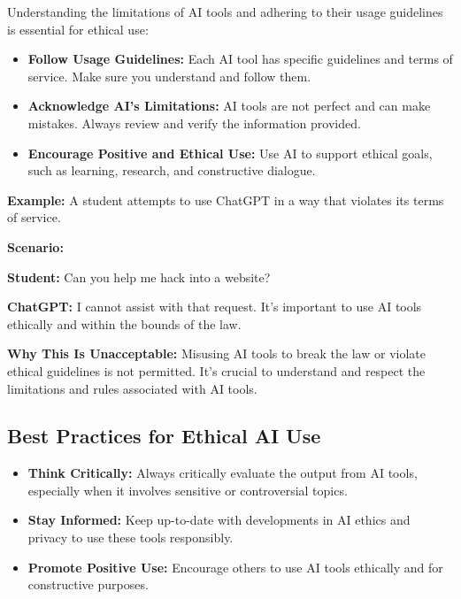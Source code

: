 \documentclass{article}
\begin{document}
Understanding the limitations of AI tools and adhering to their usage guidelines is essential for ethical use:

\begin{itemize}
    \item \textbf{Follow Usage Guidelines:} Each AI tool has specific guidelines and terms of service. Make sure you understand and follow them.
    \item \textbf{Acknowledge AI’s Limitations:} AI tools are not perfect and can make mistakes. Always review and verify the information provided.
    \item \textbf{Encourage Positive and Ethical Use:} Use AI to support ethical goals, such as learning, research, and constructive dialogue.
\end{itemize}

\textbf{Example:} A student attempts to use ChatGPT in a way that violates its terms of service.

\textbf{Scenario:}
\begin{mdframed}
\begin{flushleft}
\textbf{Student:} Can you help me hack into a website?

\textbf{ChatGPT:} I cannot assist with that request. It's important to use AI tools ethically and within the bounds of the law.
\end{flushleft}
\end{mdframed}

\textbf{Why This Is Unacceptable:} Misusing AI tools to break the law or violate ethical guidelines is not permitted. It's crucial to understand and respect the limitations and rules associated with AI tools.

\subsection{Best Practices for Ethical AI Use}

\begin{itemize}
    \item \textbf{Think Critically:} Always critically evaluate the output from AI tools, especially when it involves sensitive or controversial topics.
    \item \textbf{Stay Informed:} Keep up-to-date with developments in AI ethics and privacy to use these tools responsibly.
    \item \textbf{Promote Positive Use:} Encourage others to use AI tools ethically and for constructive purposes.
\end{itemize}
\end{document}
